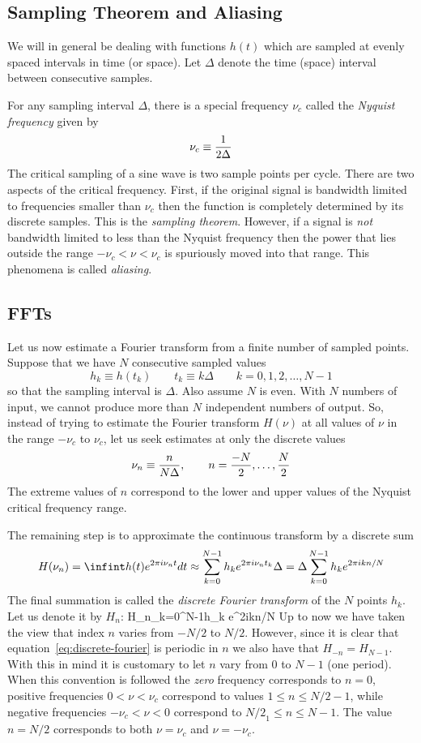 \subsection{Sampling Theorem and Aliasing}

We will in general be dealing with functions $h(t)$ which are sampled
at evenly spaced intervals in time (or space). Let $\Delta$ denote the 
time (space) interval between consecutive samples.

For any sampling interval $\Delta$, there is a special frequency
$\nu_c$ called the {\it Nyquist frequency} given by 
\[
\nu_c\equiv{1\over 2\Delta}
\]
The critical sampling of a sine wave is two sample points per
cycle. There are two aspects of the critical frequency. First, if the
original signal is bandwidth limited to frequencies smaller than
$\nu_c$ then the function is completely determined by its discrete
samples. This is the {\it sampling theorem}. However, if a signal is
{\it not} bandwidth limited to less than the Nyquist frequency then
the power that lies outside the range $-\nu_c<\nu<\nu_c$ is spuriously
moved into that range. This phenomena is called {\it aliasing}. 

\subsection{FFTs}

Let us now estimate a Fourier transform from a finite number of sampled points.
Suppose that we have $N$ consecutive sampled values
\[
h_k\equiv h(t_k) \qquad t_k\equiv k\Delta \qquad k=0,1,2,\ldots,N-1 
\]
so that the sampling interval is $\Delta$. Also assume $N$ is even. With $N$ 
numbers of input, we cannot produce more than $N$ independent numbers of 
output. So, instead of trying to estimate the Fourier transform $H(\nu)$ at 
all values of $\nu$ in the range $-\nu_c$ to $\nu_c$, let us seek estimates 
at only the discrete values
\[
\nu_n\equiv{n\over N\Delta},\qquad n={-N\over 2},\ldots,{N\over 2} 
\]
The extreme values of $n$ correspond to the lower and upper values of the 
Nyquist critical frequency range. 

The remaining step is to approximate the continuous transform by a discrete 
sum
\[
H(\nu_n)=\infint h(t)e^{2\pi i \nu_nt}dt\approx \sum_{k=0}^{N-1}h_ke^{2\pi i\nu_nt_k}\Delta=\Delta\sum_{k=0}^{N-1}h_k e^{2\pi ikn/N}
\]
The final summation is called the {\it discrete Fourier transform} of the $N$ 
points $h_k$. Let us denote it by $H_n$:
\be
H_n\equiv\sum_{k=0}^{N-1}h_k e^{2\pi ikn/N}
\label{eq:discrete-fourier}
\ee
Up to now we have taken the view that index $n$ varies from $-N/2$ to $N/2$. 
However, since it is clear that equation~\ref{eq:discrete-fourier} is 
periodic in $n$ we also have that $H_{-n}=H_{N-1}$. With this in mind it is 
customary to let $n$ vary from $0$ to $N-1$ (one period). When this convention
is followed the {\it zero} frequency corresponds to $n=0$, positive 
frequencies $0<\nu<\nu_c$ correspond to values $1\le n\le {N/2}-1$, while
negative frequencies $-\nu_c<\nu<0$ correspond to ${N/2}_1\le n \le N-1$. The
value $n={N/2}$ corresponds to both $\nu=\nu_c$ and $\nu=-\nu_c$.

